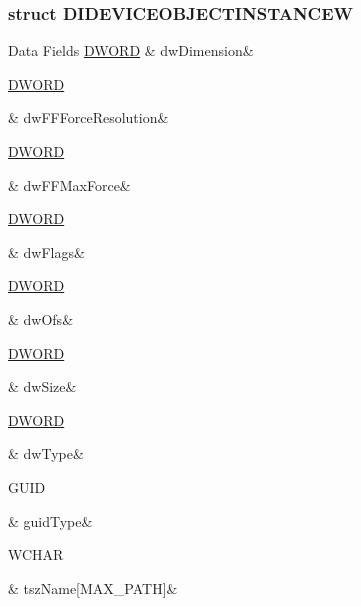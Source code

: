 \subsubsection{struct D\-I\-D\-E\-V\-I\-C\-E\-O\-B\-J\-E\-C\-T\-I\-N\-S\-T\-A\-N\-C\-E\-W}
\begin{DoxyFields}{Data Fields}
\hypertarget{a00003_a7799789c487a6df022d2aeb2a2652ad6}{\hyperlink{a00003_a50e15ae51c87ae06ab29c8148cb5f36c}{D\-W\-O\-R\-D}}\label{a00003_a7799789c487a6df022d2aeb2a2652ad6}
&
dw\-Dimension&
\\
\hline

\hypertarget{a00003_ad6eb00ae9357c8f79b5371d61bddc24e}{\hyperlink{a00003_a50e15ae51c87ae06ab29c8148cb5f36c}{D\-W\-O\-R\-D}}\label{a00003_ad6eb00ae9357c8f79b5371d61bddc24e}
&
dw\-F\-F\-Force\-Resolution&
\\
\hline

\hypertarget{a00003_ac3494e65997fbaa4212eeccb1146cada}{\hyperlink{a00003_a50e15ae51c87ae06ab29c8148cb5f36c}{D\-W\-O\-R\-D}}\label{a00003_ac3494e65997fbaa4212eeccb1146cada}
&
dw\-F\-F\-Max\-Force&
\\
\hline

\hypertarget{a00003_a4d2f405b1141000eb2af256e0fc8b98b}{\hyperlink{a00003_a50e15ae51c87ae06ab29c8148cb5f36c}{D\-W\-O\-R\-D}}\label{a00003_a4d2f405b1141000eb2af256e0fc8b98b}
&
dw\-Flags&
\\
\hline

\hypertarget{a00003_a2f0da10f0bff2a910138cc1b5715cdd5}{\hyperlink{a00003_a50e15ae51c87ae06ab29c8148cb5f36c}{D\-W\-O\-R\-D}}\label{a00003_a2f0da10f0bff2a910138cc1b5715cdd5}
&
dw\-Ofs&
\\
\hline

\hypertarget{a00003_a669c5a85f5a9eb97e64ad880fadaaa2d}{\hyperlink{a00003_a50e15ae51c87ae06ab29c8148cb5f36c}{D\-W\-O\-R\-D}}\label{a00003_a669c5a85f5a9eb97e64ad880fadaaa2d}
&
dw\-Size&
\\
\hline

\hypertarget{a00003_a81f5eff8d90c90eabc4c9a97d3ea7142}{\hyperlink{a00003_a50e15ae51c87ae06ab29c8148cb5f36c}{D\-W\-O\-R\-D}}\label{a00003_a81f5eff8d90c90eabc4c9a97d3ea7142}
&
dw\-Type&
\\
\hline

\hypertarget{a00003_aea5d3a608916b9ac856b773042e5051a}{G\-U\-I\-D}\label{a00003_aea5d3a608916b9ac856b773042e5051a}
&
guid\-Type&
\\
\hline

\hypertarget{a00003_a63701bade4cd23a8246a900ec69342c6}{W\-C\-H\-A\-R}\label{a00003_a63701bade4cd23a8246a900ec69342c6}
&
tsz\-Name\mbox{[}M\-A\-X\-\_\-\-P\-A\-T\-H\mbox{]}&
\\
\hline


\end{DoxyFields}

